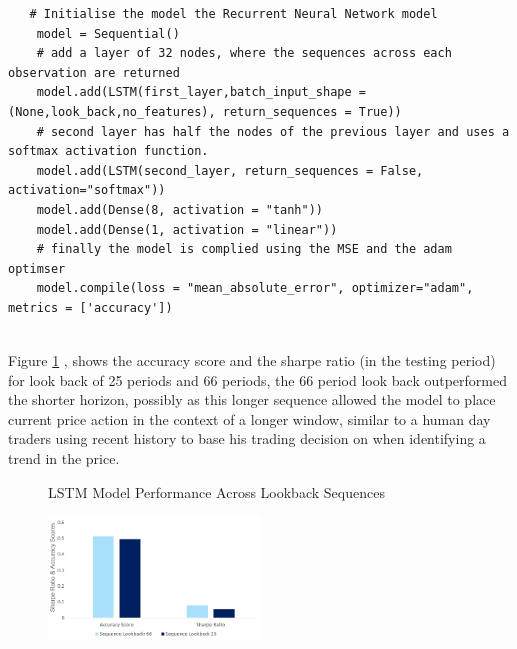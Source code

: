 \documentclass[11pt]{article}
\begin{document}
\vspace{4mm}
\begin{lstlisting}
   # Initialise the model the Recurrent Neural Network model
    model = Sequential()
    # add a layer of 32 nodes, where the sequences across each observation are returned 
    model.add(LSTM(first_layer,batch_input_shape = (None,look_back,no_features), return_sequences = True))
    # second layer has half the nodes of the previous layer and uses a softmax activation function.
    model.add(LSTM(second_layer, return_sequences = False, activation="softmax"))
    model.add(Dense(8, activation = "tanh"))
    model.add(Dense(1, activation = "linear"))
    # finally the model is complied using the MSE and the adam optimser
    model.compile(loss = "mean_absolute_error", optimizer="adam", metrics = ['accuracy'])
    
\end{lstlisting}
Figure \ref{fig:LSTMlookbacks} , shows the accuracy score and the sharpe ratio (in the testing period) for look back of 25 periods and 66 periods, the 66 period look back outperformed the shorter horizon, possibly as this longer sequence allowed the model to place current price action in the context of a longer window, similar to a human day traders using recent history to base his trading decision on when identifying a trend in the price.
\begin{figure}[h]
    \centering
	\caption{LSTM Model Performance Across Lookback Sequences}    
	\includegraphics[width=0.5\textwidth]{LSTMlookbacks}
    \label{fig:LSTMlookbacks}
     \caption*{}
\end{figure}
\end{document}

